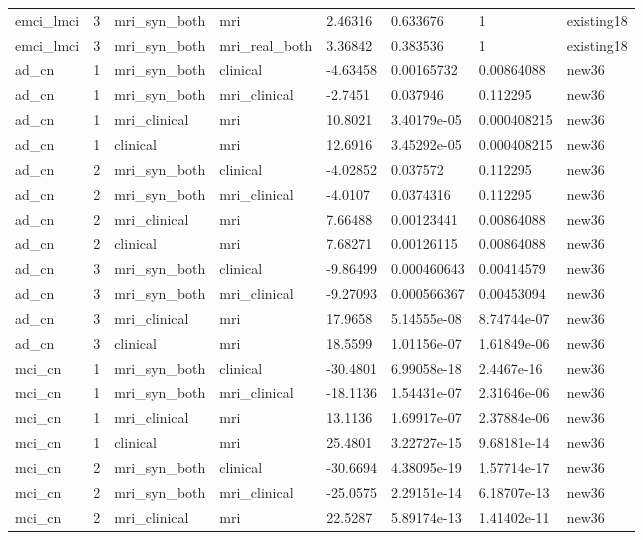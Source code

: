 \begin{landscape}
\begin{longtable}{llllllll}
emci\_lmci & 3 & mri\_syn\_both & mri & 2.46316 & 0.633676 & 1 & existing18 \\
emci\_lmci & 3 & mri\_syn\_both & mri\_real\_both & 3.36842 & 0.383536 & 1 & existing18 \\
ad\_cn & 1 & mri\_syn\_both & clinical & -4.63458 & 0.00165732 & 0.00864088 & new36 \\
ad\_cn & 1 & mri\_syn\_both & mri\_clinical & -2.7451 & 0.037946 & 0.112295 & new36 \\
ad\_cn & 1 & mri\_clinical & mri & 10.8021 & 3.40179e-05 & 0.000408215 & new36 \\
ad\_cn & 1 & clinical & mri & 12.6916 & 3.45292e-05 & 0.000408215 & new36 \\
ad\_cn & 2 & mri\_syn\_both & clinical & -4.02852 & 0.037572 & 0.112295 & new36 \\
ad\_cn & 2 & mri\_syn\_both & mri\_clinical & -4.0107 & 0.0374316 & 0.112295 & new36 \\
ad\_cn & 2 & mri\_clinical & mri & 7.66488 & 0.00123441 & 0.00864088 & new36 \\
ad\_cn & 2 & clinical & mri & 7.68271 & 0.00126115 & 0.00864088 & new36 \\
ad\_cn & 3 & mri\_syn\_both & clinical & -9.86499 & 0.000460643 & 0.00414579 & new36 \\
ad\_cn & 3 & mri\_syn\_both & mri\_clinical & -9.27093 & 0.000566367 & 0.00453094 & new36 \\
ad\_cn & 3 & mri\_clinical & mri & 17.9658 & 5.14555e-08 & 8.74744e-07 & new36 \\
ad\_cn & 3 & clinical & mri & 18.5599 & 1.01156e-07 & 1.61849e-06 & new36 \\
mci\_cn & 1 & mri\_syn\_both & clinical & -30.4801 & 6.99058e-18 & 2.4467e-16 & new36 \\
mci\_cn & 1 & mri\_syn\_both & mri\_clinical & -18.1136 & 1.54431e-07 & 2.31646e-06 & new36 \\
mci\_cn & 1 & mri\_clinical & mri & 13.1136 & 1.69917e-07 & 2.37884e-06 & new36 \\
mci\_cn & 1 & clinical & mri & 25.4801 & 3.22727e-15 & 9.68181e-14 & new36 \\
mci\_cn & 2 & mri\_syn\_both & clinical & -30.6694 & 4.38095e-19 & 1.57714e-17 & new36 \\
mci\_cn & 2 & mri\_syn\_both & mri\_clinical & -25.0575 & 2.29151e-14 & 6.18707e-13 & new36 \\
mci\_cn & 2 & mri\_clinical & mri & 22.5287 & 5.89174e-13 & 1.41402e-11 & new36 \\

\end{longtable}
\end{landscape}
